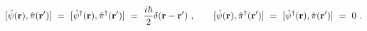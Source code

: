 \begin{equation}
\lbrack \hat{\psi}({\bf r}),\hat{\pi}({\bf r^{\prime }})]\ =\ [\hat{\psi}%
^{\dagger }({\bf r}),\hat{\pi}^{\dagger }({\bf r^{\prime }})]\ =\ {\frac{%
i\hbar }{2}}\delta ({\bf r}-{\bf r^{\prime }})
\ ,\qquad
\lbrack \hat{\psi}({\bf r}),\hat{\pi}^{\dagger }({\bf r^{\prime }})]\ 
=\ [\hat{\psi}%
^{\dagger }({\bf r}),\hat{\pi}({\bf r^{\prime }})]\ =\ 0
\ .  \label{comm3}
\end{equation}%
